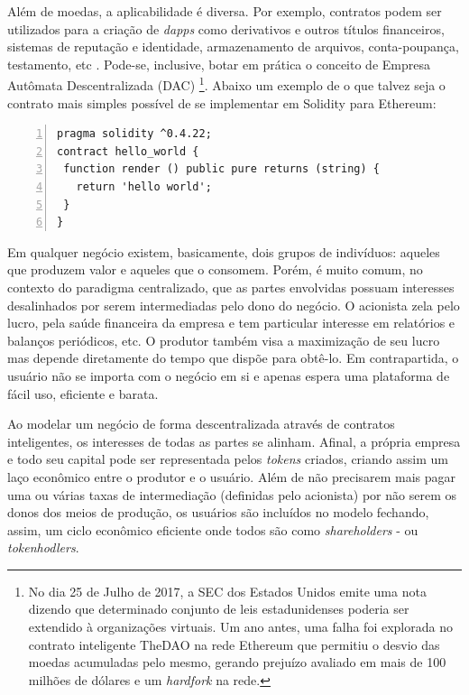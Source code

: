 \documentclass[a4paper,12pt]{monografia}
\theoremstyle{plain}
\theoremstyle{definition}
\theoremstyle{remark}
\begin{document}
Al\'em de moedas, a aplicabilidade \'e diversa.
Por exemplo, contratos podem ser utilizados para a cria\c{c}\~ao de \textit{dapps} como derivativos e outros t\'itulos financeiros, sistemas de reputa\c{c}\~ao e identidade, armazenamento de arquivos, conta-poupan\c{c}a, testamento, etc \cite{ethereum}.
Pode-se, inclusive, botar em pr\'atica o conceito de Empresa Aut\^omata Descentralizada (DAC) \cite{dac}\footnote{No dia 25 de Julho de 2017, a SEC dos Estados Unidos emite uma nota dizendo que determinado conjunto de leis estadunidenses poderia ser extendido \`a organiza\c{c}\~oes virtuais.
Um ano antes, uma falha foi explorada no contrato inteligente TheDAO na rede Ethereum que permitiu o desvio das moedas acumuladas pelo mesmo, gerando preju\'izo avaliado em mais de 100 milh\~oes de d\'olares e um \textit{hardfork} na rede.}.
Abaixo um exemplo de o que talvez seja o contrato mais simples poss\'ivel de se implementar em Solidity para Ethereum:

\lstset{tabsize=5,language=javascript,showstringspaces=false,basicstyle=\ttfamily\small,keywordstyle=\bf,breaklines=true}
\begin{singlespacing}
\begin{lstlisting}[frame=single,framexrightmargin=1pt,numbers=left]
pragma solidity ^0.4.22;
contract hello_world {
 function render () public pure returns (string) {
   return 'hello world';
 }
}
\end{lstlisting}
\end{singlespacing}

Em qualquer neg\'{o}cio existem, basicamente, dois grupos de indiv\'{i}duos: aqueles que produzem valor e aqueles que o consomem.
Por\'{e}m, \'{e} muito comum, no contexto do paradigma centralizado, que as partes envolvidas possuam interesses desalinhados por serem intermediadas pelo dono do neg\'ocio.
O acionista zela pelo lucro, pela sa\'{u}de financeira da empresa e tem particular interesse em relat\'{o}rios e balan\c{c}os peri\'{o}dicos, etc.
O produtor tamb\'{e}m visa a maximiza\c{c}\~{a}o de seu lucro mas depende diretamente do tempo que disp\~oe para obt\^e-lo.
Em contrapartida, o usu\'{a}rio n\~{a}o se importa com o neg\'{o}cio em si e apenas espera uma plataforma de f\'{a}cil uso, eficiente e barata.

Ao modelar um neg\'{o}cio de forma descentralizada atrav\'{e}s de contratos inteligentes, os interesses de todas as partes se alinham.
Afinal, a pr\'{o}pria empresa e todo seu capital pode ser representada pelos \textit{tokens} criados, criando assim um la\c{c}o econ\^omico entre o produtor e o usu\'ario.
Al\'{e}m de n\~{a}o precisarem mais pagar uma ou v\'arias taxas de intermedia\c{c}\~ao (definidas pelo acionista) por n\~{a}o serem os donos dos meios de produ\c{c}\~{a}o, os usu\'{a}rios s\~{a}o inclu\'{i}dos no modelo fechando, assim, um ciclo econ\^{o}mico eficiente onde todos s\~{a}o como \textit{shareholders} - ou \textit{tokenhodlers}.
\end{document}
